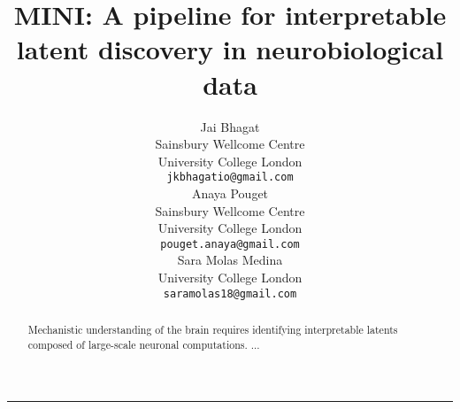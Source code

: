 \documentclass{article}
\title{
  MINI: A pipeline for interpretable latent discovery in neurobiological data
}
\author{%
  Jai Bhagat \\
  Sainsbury Wellcome Centre \\
  University College London \\
  \texttt{jkbhagatio@gmail.com} \\
  \And
  Anaya Pouget \\
  Sainsbury Wellcome Centre \\
  University College London \\
  \texttt{pouget.anaya@gmail.com} \\
  \And
  Sara Molas Medina \\
  University College London \\
  \texttt{saramolas18@gmail.com} \\
}
\begin{document}
\maketitle

\begin{abstract}
Mechanistic understanding of the brain requires identifying interpretable latents composed 
of large-scale neuronal computations. ...
\end{abstract}






\vspace{2em} \hrule  
\newpage







\end{document}
